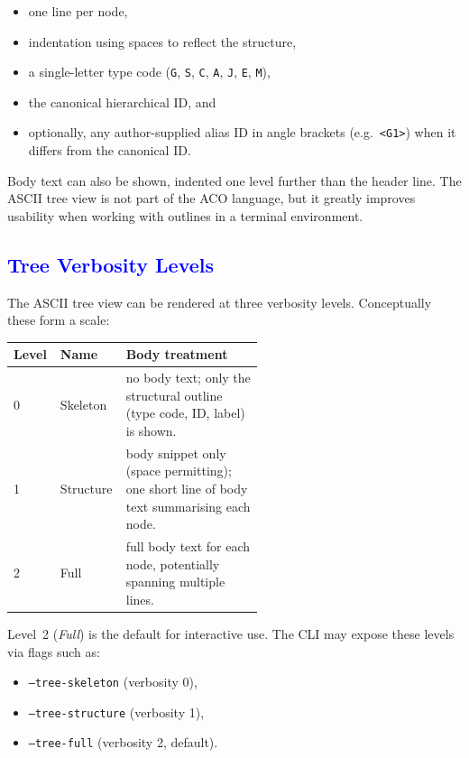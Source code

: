 \documentclass[11pt]{article}
\begin{document}
\begin{itemize}[leftmargin=2em]
  \item one line per node,
  \item indentation using spaces to reflect the structure,
  \item a single-letter type code (\texttt{G}, \texttt{S}, \texttt{C}, \texttt{A}, \texttt{J}, \texttt{E}, \texttt{M}),
  \item the canonical hierarchical ID, and
  \item optionally, any author-supplied alias ID in angle brackets (e.g.\ \texttt{<G1>}) when it differs from the canonical ID.
\end{itemize}

Body text can also be shown, indented one level further than the header line. The ASCII tree view is not part of the ACO language, but it greatly improves usability when working with outlines in a terminal environment.

\subsection*{\textcolor{blue}{Tree Verbosity Levels}}

\begingroup
\color{blue}
The ASCII tree view can be rendered at three verbosity levels. Conceptually these form a scale:

\begin{center}
\begin{tabular}{llp{0.55\linewidth}}
\textbf{Level} & \textbf{Name}     & \textbf{Body treatment} \\
\hline
0 & Skeleton  & no body text; only the structural outline (type code, ID, label) is shown. \\
1 & Structure & body snippet only (space permitting); one short line of body text summarising each node. \\
2 & Full      & full body text for each node, potentially spanning multiple lines. \\
\end{tabular}
\end{center}

Level~2 (\emph{Full}) is the default for interactive use. The CLI may expose these levels via flags such as:

\begin{itemize}[leftmargin=2em]
  \item \texttt{--tree-skeleton} (verbosity 0),
  \item \texttt{--tree-structure} (verbosity 1),
  \item \texttt{--tree-full} (verbosity 2, default).
\end{itemize}
\end{document}
